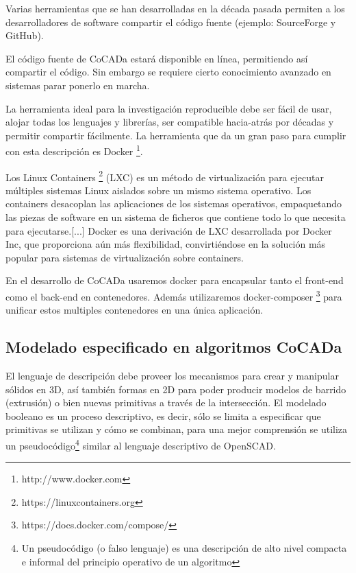 \begin{displayquote}
Varias herramientas que se han desarrolladas en la década pasada permiten a los desarrolladores de software compartir el código fuente (ejemplo: SourceForge y GitHub).\citep{Chamberlain2014}\end{displayquote}

El código fuente de CoCADa estará disponible en línea, permitiendo así compartir el código. Sin embargo se requiere cierto conocimiento avanzado en sistemas parar ponerlo en marcha.

\begin{displayquote}
La herramienta ideal para la investigación reproducible debe ser fácil de usar, alojar todas los lenguajes y librerías, ser compatible hacia-atrás por décadas y permitir compartir fácilmente. La herramienta que da un gran paso para cumplir con esta descripción es Docker  \footnote{http://www.docker.com}. \citep{Chamberlain2014}
\end{displayquote}

\begin{displayquote}
Los Linux Containers \footnote{https://linuxcontainers.org} (LXC) es un método de virtualización para ejecutar múltiples sistemas Linux aislados sobre un mismo sistema operativo. Los containers desacoplan las aplicaciones de los sistemas operativos, empaquetando las piezas de software en un sistema de ficheros que contiene todo lo que necesita para ejecutarse.[...] Docker es una derivación de LXC desarrollada por Docker Inc, que proporciona aún más flexibilidad, convirtiéndose en la solución más popular para sistemas de virtualización sobre containers\citep{Alonso2017}.
\end{displayquote}

En el desarrollo de CoCADa usaremos docker para encapsular tanto el front-end como el back-end en contenedores. Además utilizaremos docker-composer  \footnote{https://docs.docker.com/compose/} para unificar estos multiples contenedores en una única aplicación.


\subsection{Modelado especificado en algoritmos CoCADa}

El lenguaje de descripción debe proveer los mecanismos para crear y manipular sólidos en 3D, así también formas en 2D para poder producir modelos de barrido (extrusión) o bien nuevas primitivas a través de la intersección. El  modelado  booleano  es  un proceso  descriptivo,  es  decir,  sólo  se limita  a  especificar que primitivas se utilizan y cómo se combinan, para una mejor comprensión se utiliza un pseudocódigo\footnote{Un pseudocódigo (o falso lenguaje) es una descripción de alto nivel compacta e informal del principio operativo de un algoritmo} similar al lenguaje descriptivo de OpenSCAD.

